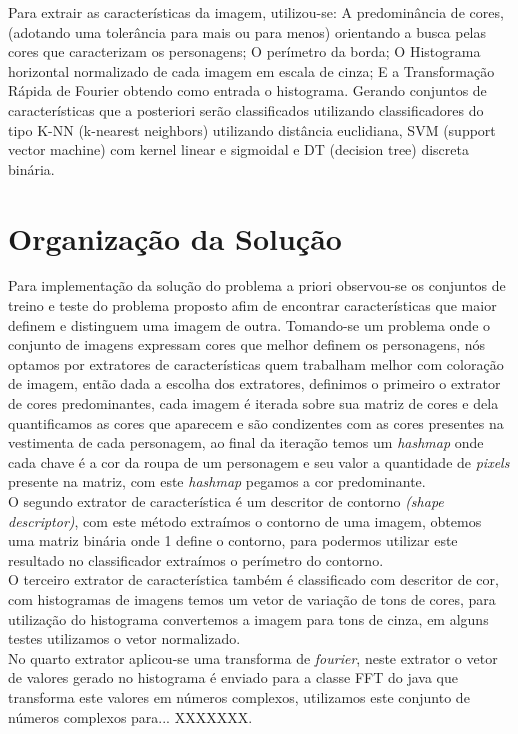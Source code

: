 \documentclass[12pt]{article}
\begin{document}
	Para extrair as características da imagem, utilizou-se: A predominância de cores, (adotando uma tolerância para mais ou para menos) orientando a busca pelas cores que caracterizam os personagens; O perímetro da borda; O Histograma horizontal normalizado de cada imagem em escala de cinza; E a Transformação Rápida de Fourier obtendo como entrada o histograma. Gerando conjuntos de características que a posteriori serão classificados utilizando classificadores do tipo K-NN (k-nearest neighbors) utilizando distância euclidiana, SVM (support vector machine) com kernel linear e sigmoidal e DT (decision tree) discreta binária.

\section{Organização da Solução}\label{sec:solucao}

	Para implementação da solução do problema a priori observou-se os conjuntos de treino e teste do problema proposto afim de encontrar características que maior definem e distinguem uma imagem de outra. Tomando-se um problema onde o conjunto de imagens expressam cores que melhor definem os personagens, nós optamos por extratores de características quem trabalham melhor com coloração de imagem, então dada a escolha dos extratores, definimos o primeiro o extrator de cores predominantes, cada imagem é iterada sobre sua matriz de cores e dela quantificamos as cores que aparecem e são condizentes com as cores presentes na vestimenta de cada personagem, ao final da iteração temos um \textit{hashmap} onde cada chave é a cor da roupa de um personagem e seu valor a quantidade de \textit{pixels} presente na matriz, com este \textit{hashmap} pegamos a cor predominante.\\
	O segundo extrator de característica é um descritor de contorno \textit{(shape descriptor)}, com este método extraímos o contorno de uma imagem, obtemos uma matriz binária onde 1 define o contorno, para podermos utilizar este resultado no classificador extraímos o perímetro do contorno. \\
	O terceiro extrator de característica também é classificado com descritor de cor, com histogramas de imagens temos um vetor de variação de tons de cores, para utilização do histograma convertemos a imagem para tons de cinza, em alguns testes utilizamos o vetor normalizado.\\
	No quarto extrator aplicou-se uma transforma de \textit{fourier}, neste extrator o vetor de valores gerado no histograma é enviado para a classe FFT do java que transforma este valores em números complexos, utilizamos este conjunto de números complexos para... XXXXXXX.
\end{document}
